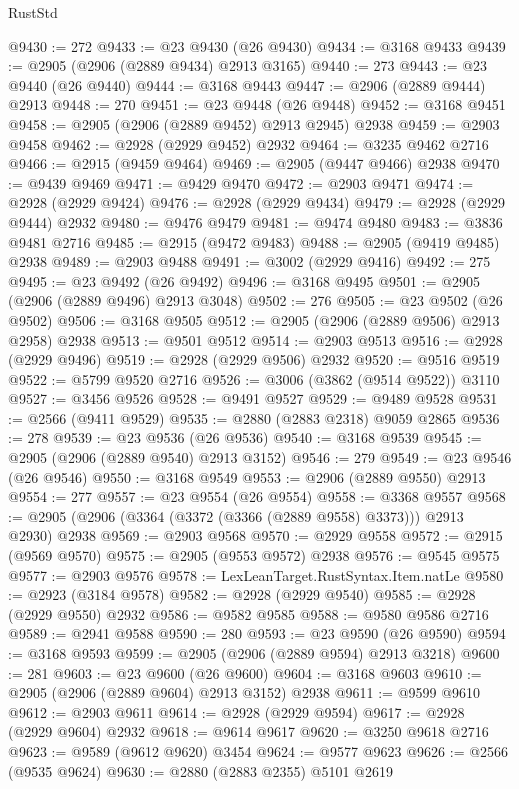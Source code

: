 \begin{lexlean}{RustStd}
\begin{coremodule}
@9430 := 272
@9433 := @23 @9430 (@26 @9430)
@9434 := @3168 @9433
@9439 := @2905 (@2906 (@2889 @9434) @2913 @3165)
@9440 := 273
@9443 := @23 @9440 (@26 @9440)
@9444 := @3168 @9443
@9447 := @2906 (@2889 @9444) @2913
@9448 := 270
@9451 := @23 @9448 (@26 @9448)
@9452 := @3168 @9451
@9458 := @2905 (@2906 (@2889 @9452) @2913 @2945) @2938
@9459 := @2903 @9458
@9462 := @2928 (@2929 @9452) @2932
@9464 := @3235 @9462 @2716
@9466 := @2915 (@9459 @9464)
@9469 := @2905 (@9447 @9466) @2938
@9470 := @9439 @9469
@9471 := @9429 @9470
@9472 := @2903 @9471
@9474 := @2928 (@2929 @9424)
@9476 := @2928 (@2929 @9434)
@9479 := @2928 (@2929 @9444) @2932
@9480 := @9476 @9479
@9481 := @9474 @9480
@9483 := @3836 @9481 @2716
@9485 := @2915 (@9472 @9483)
@9488 := @2905 (@9419 @9485) @2938
@9489 := @2903 @9488
@9491 := @3002 (@2929 @9416)
@9492 := 275
@9495 := @23 @9492 (@26 @9492)
@9496 := @3168 @9495
@9501 := @2905 (@2906 (@2889 @9496) @2913 @3048)
@9502 := 276
@9505 := @23 @9502 (@26 @9502)
@9506 := @3168 @9505
@9512 := @2905 (@2906 (@2889 @9506) @2913 @2958) @2938
@9513 := @9501 @9512
@9514 := @2903 @9513
@9516 := @2928 (@2929 @9496)
@9519 := @2928 (@2929 @9506) @2932
@9520 := @9516 @9519
@9522 := @5799 @9520 @2716
@9526 := @3006 (@3862 (@9514 @9522)) @3110
@9527 := @3456 @9526
@9528 := @9491 @9527
@9529 := @9489 @9528
@9531 := @2566 (@9411 @9529)
@9535 := @2880 (@2883 @2318) @9059 @2865
@9536 := 278
@9539 := @23 @9536 (@26 @9536)
@9540 := @3168 @9539
@9545 := @2905 (@2906 (@2889 @9540) @2913 @3152)
@9546 := 279
@9549 := @23 @9546 (@26 @9546)
@9550 := @3168 @9549
@9553 := @2906 (@2889 @9550) @2913
@9554 := 277
@9557 := @23 @9554 (@26 @9554)
@9558 := @3368 @9557
@9568 := @2905 (@2906 (@3364 (@3372 (@3366 (@2889 @9558) @3373))) @2913 @2930) @2938
@9569 := @2903 @9568
@9570 := @2929 @9558
@9572 := @2915 (@9569 @9570)
@9575 := @2905 (@9553 @9572) @2938
@9576 := @9545 @9575
@9577 := @2903 @9576
@9578 := LexLeanTarget.RustSyntax.Item.natLe
@9580 := @2923 (@3184 @9578)
@9582 := @2928 (@2929 @9540)
@9585 := @2928 (@2929 @9550) @2932
@9586 := @9582 @9585
@9588 := @9580 @9586 @2716
@9589 := @2941 @9588
@9590 := 280
@9593 := @23 @9590 (@26 @9590)
@9594 := @3168 @9593
@9599 := @2905 (@2906 (@2889 @9594) @2913 @3218)
@9600 := 281
@9603 := @23 @9600 (@26 @9600)
@9604 := @3168 @9603
@9610 := @2905 (@2906 (@2889 @9604) @2913 @3152) @2938
@9611 := @9599 @9610
@9612 := @2903 @9611
@9614 := @2928 (@2929 @9594)
@9617 := @2928 (@2929 @9604) @2932
@9618 := @9614 @9617
@9620 := @3250 @9618 @2716
@9623 := @9589 (@9612 @9620) @3454
@9624 := @9577 @9623
@9626 := @2566 (@9535 @9624)
@9630 := @2880 (@2883 @2355) @5101 @2619

\end{coremodule}
\end{lexlean}
